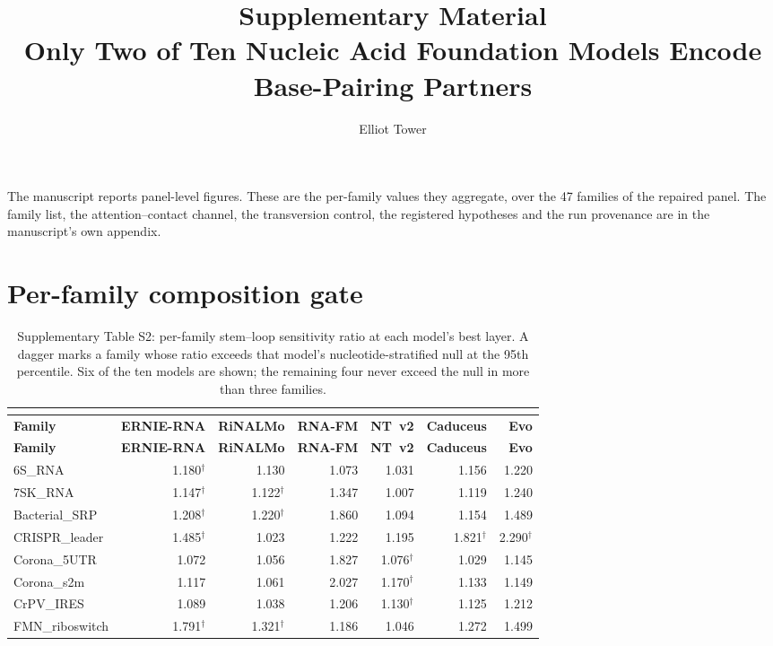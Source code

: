 \documentclass[11pt]{article}
\title{Supplementary Material\\Only Two of Ten Nucleic Acid
Foundation Models Encode Base-Pairing Partners}
\author{Elliot Tower}
\date{}
\begin{document}
\maketitle

The manuscript reports panel-level figures. These are the per-family values they
aggregate, over the 47 families of the repaired
panel. The family list, the attention--contact channel, the transversion
control, the registered hypotheses and the run provenance are in the
manuscript's own appendix.

\section*{Per-family composition gate}

\begin{longtable}{@{}lrrrrrr@{}}
\caption{Supplementary Table S2: per-family stem--loop sensitivity ratio at each model's best layer. A dagger marks a family whose ratio exceeds that model's nucleotide-stratified null at the 95th percentile. Six of the ten models are shown; the remaining four never exceed the null in more than three families.}\\
\label{tab:s2}\\
\toprule
\textbf{Family} & \textbf{ERNIE-RNA} & \textbf{RiNALMo} & \textbf{RNA-FM} & \textbf{NT~v2} & \textbf{Caduceus} & \textbf{Evo} \\
\midrule
\endfirsthead
\toprule
\textbf{Family} & \textbf{ERNIE-RNA} & \textbf{RiNALMo} & \textbf{RNA-FM} & \textbf{NT~v2} & \textbf{Caduceus} & \textbf{Evo} \\
\midrule
\endhead
6S\_RNA & 1.180$^\dagger$ & 1.130 & 1.073 & 1.031 & 1.156 & 1.220 \\
7SK\_RNA & 1.147$^\dagger$ & 1.122$^\dagger$ & 1.347 & 1.007 & 1.119 & 1.240 \\
Bacterial\_SRP & 1.208$^\dagger$ & 1.220$^\dagger$ & 1.860 & 1.094 & 1.154 & 1.489 \\
CRISPR\_leader & 1.485$^\dagger$ & 1.023 & 1.222 & 1.195 & 1.821$^\dagger$ & 2.290$^\dagger$ \\
Corona\_5UTR & 1.072 & 1.056 & 1.827 & 1.076$^\dagger$ & 1.029 & 1.145 \\
Corona\_s2m & 1.117 & 1.061 & 2.027 & 1.170$^\dagger$ & 1.133 & 1.149 \\
CrPV\_IRES & 1.089 & 1.038 & 1.206 & 1.130$^\dagger$ & 1.125 & 1.212 \\
FMN\_riboswitch & 1.791$^\dagger$ & 1.321$^\dagger$ & 1.186 & 1.046 & 1.272 & 1.499 \\

\end{longtable}
\end{document}
